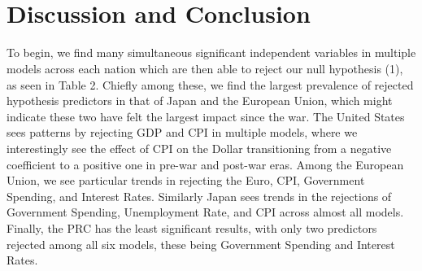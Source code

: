 \documentclass[11pt,regno]{amsart}
\theoremstyle{plain}
\numberwithin{equation}{section}
\begin{document}
\ 

\ 

\ 

\ 

\ 

\ 

\ 

\ 

\ 

\ 

\ 

\ 


\ 

\ 

\ 

\ 

\ 

\ 

\ 

\ 

\ 

\ 

\ 

\ 













\section*{Discussion and Conclusion}
To begin, we find many simultaneous significant independent variables in multiple models across each nation which are then able to reject our null hypothesis (1), as seen in Table 2.  Chiefly among these, we find the largest prevalence of rejected hypothesis predictors in that of Japan and the European Union, which might indicate these two have felt the largest impact since the war. The United States sees patterns by rejecting GDP and CPI in multiple models, where we interestingly see the effect of CPI on the Dollar transitioning from a negative coefficient to a positive one in pre-war and post-war eras. Among the European Union, we see particular trends in rejecting the Euro, CPI, Government Spending, and Interest Rates. Similarly Japan sees trends in the rejections of Government Spending, Unemployment Rate, and CPI across almost all models. Finally, the PRC has the least significant results, with only two predictors rejected among all six models, these being Government Spending and Interest Rates.
\end{document}
